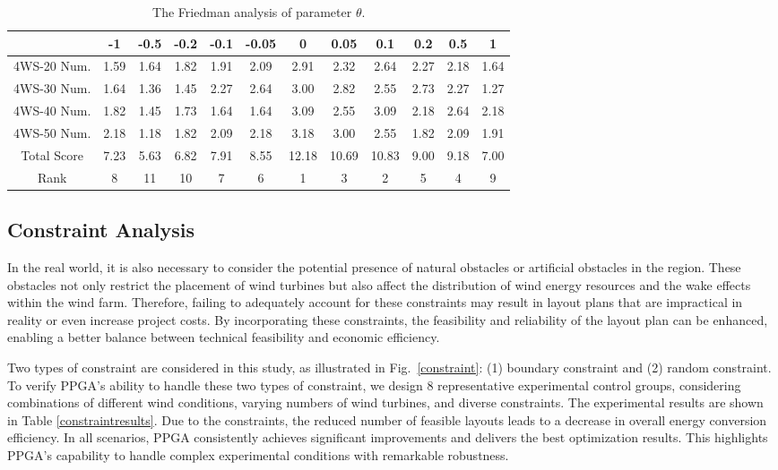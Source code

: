 \documentclass[journal,twoside]{IEEEtran}
\begin{document}
\begin{table}[t!]
	\centering
	\caption{The Friedman analysis of parameter $\theta$.}
	\label{ablation}
	\begin{tabular}{cccccccccccc} \hline
		\diagbox{Score}{$\theta$} & -1  & -0.5 & -0.2 & -0.1 & -0.05 & 0 & 0.05 & 0.1 & 0.2 & 0.5 & 1 \\	\hline
		4WS-20 Num.     &	1.59 &	1.64 &	1.82  &	1.91 & 2.09	& 2.91 & 2.32 & 2.64 & 2.27 & 2.18 & 1.64 \\	 \hline
		4WS-30 Num.     &	1.64 &	1.36 &	1.45  &	2.27 & 2.64	& 3.00 & 2.82 & 2.55 & 2.73 & 2.27 & 1.27 \\	 \hline
		4WS-40 Num.     &	1.82 &	1.45 &	1.73  &	1.64 & 1.64	& 3.09 & 2.55 & 3.09 & 2.18 & 2.64 & 2.18 \\	 \hline
		4WS-50 Num.     &	2.18 &	1.18 &	1.82  &	2.09 & 2.18	& 3.18 & 3.00 & 2.55 & 1.82 & 2.09 & 1.91 \\	 \hline
		Total Score   &	7.23 &	5.63 &	6.82  &	7.91 & 8.55	& 12.18 & 10.69 & 10.83 & 9.00 & 9.18 & 7.00 \\\hline
		Rank	 &	8	 &	11	 &	10	 & 7	& 6 & 1 & 3 & 2 & 5 & 4 & 9 	\\ \hline
	\end{tabular}
\end{table}
\subsection{Constraint Analysis}
In the real world, it is also necessary to consider the potential presence of natural obstacles or artificial obstacles in the region. These obstacles not only restrict the placement of wind turbines but also affect the distribution of wind energy resources and the wake effects within the wind farm. Therefore, failing to adequately account for these constraints may result in layout plans that are impractical in reality or even increase project costs. By incorporating these constraints, the feasibility and reliability of the layout plan can be enhanced, enabling a better balance between technical feasibility and economic efficiency.

Two types of constraint are considered in this study, as illustrated in Fig.~\ref{constraint}: (1) boundary constraint and (2) random constraint. To verify PPGA's ability to handle these two types of constraint, we design 8 representative experimental control groups, considering combinations of different wind conditions, varying numbers of wind turbines, and diverse constraints. The experimental results are shown in Table \ref{constraintresults}. Due to the constraints, the reduced number of feasible layouts leads to a decrease in overall energy conversion efficiency. In all scenarios, PPGA consistently achieves significant improvements and delivers the best optimization results. This highlights PPGA's capability to handle complex experimental conditions with remarkable robustness.
\end{document}
